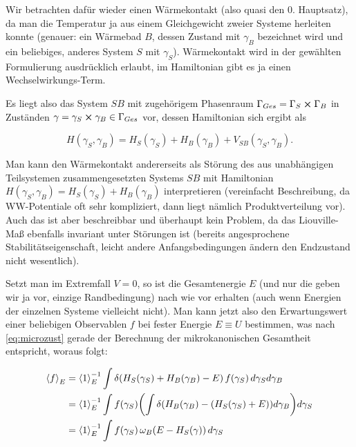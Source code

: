 Wir betrachten dafür wieder einen Wärmekontakt (also quasi den 0. Hauptsatz), da man die Temperatur ja aus einem Gleichgewicht zweier Systeme herleiten konnte (genauer: ein Wärmebad $B$, dessen Zustand mit $\gamma_B$ bezeichnet wird und ein beliebiges, anderes System $S$ mit $\gamma_S$). Wärmekontakt wird in der gewählten Formulierung ausdrücklich erlaubt, im Hamiltonian gibt es ja einen Wechselwirkungs-Term.

Es liegt also das System $SB$ mit zugehörigem Phasenraum $\Gamma_{Ges} = \Gamma_S \cross \Gamma_B$ in Zuständen $\gamma = \gamma_S \cross \gamma_B \in \Gamma_{Ges}$ vor, dessen Hamiltonian sich ergibt als

\begin{equation}
H(\gamma_S, \gamma_B) = H_S(\gamma_S) + H_B(\gamma_B) + V_{SB}(\gamma_S, \gamma_B) .
\end{equation}

Man kann den Wärmekontakt andererseits als Störung des aus unabhängigen Teilsystemen zusammengesetzten Systems $SB$ mit Hamiltonian $H(\gamma_S, \gamma_B) = H_S(\gamma_S) + H_B(\gamma_B)$ interpretieren (vereinfacht Beschreibung, da WW-Potentiale oft sehr kompliziert, dann liegt nämlich Produktverteilung vor). Auch das ist aber beschreibbar und überhaupt kein Problem, da das Liouville-Maß ebenfalls invariant unter Störungen ist (bereits angesprochene Stabilitätseigenschaft, leicht andere Anfangsbedingungen ändern den Endzustand nicht wesentlich).

Setzt man im Extremfall $V = 0$, so ist die Gesamtenergie $E$ (und nur die geben wir ja vor, einzige Randbedingung) nach wie vor erhalten (auch wenn Energien der einzelnen Systeme vielleicht nicht). Man kann jetzt also den Erwartungswert einer beliebigen Observablen $f$ bei fester Energie $E \equiv U$ bestimmen, was nach \eqref{eq:microzust} gerade der Berechnung der mikrokanonischen Gesamtheit entspricht, woraus folgt:

\begin{align}
\expval{f}_E &= \expval{1}_E^{-1} \int \delta\qty(H_S(\gamma_S) + H_B(\gamma_B) - E) \, f(\gamma_S) \, d\gamma_S d\gamma_B
\notag\\
&= \expval{1}_E^{-1} \int f(\gamma_S) \qty(\int \delta\qty(H_B(\gamma_B) - (H_S(\gamma_S) + E)) d\gamma_B) d\gamma_S 
\notag\\
&= \expval{1}_E^{-1} \int f(\gamma_S) \, \omega_B\qty(E-H_S(\gamma)) \, d\gamma_S
\end{align}

	\\

